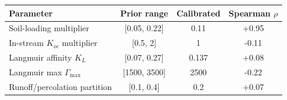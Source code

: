 \begin{tabular}{lccc}
\hline
Parameter & Prior range & Calibrated & Spearman $\rho$ \\
\hline
Soil-loading multiplier & [0.05, 0.22] & 0.11 & +0.95 \\
In-stream $K_{oc}$ multiplier & [0.5, 2] & 1 & -0.11 \\
Langmuir affinity $K_L$ & [0.07, 0.27] & 0.137 & +0.08 \\
Langmuir max $\Gamma_{\max}$ & [1500, 3500] & 2500 & -0.22 \\
Runoff/percolation partition & [0.1, 0.4] & 0.2 & +0.07 \\
\hline
\end{tabular}
